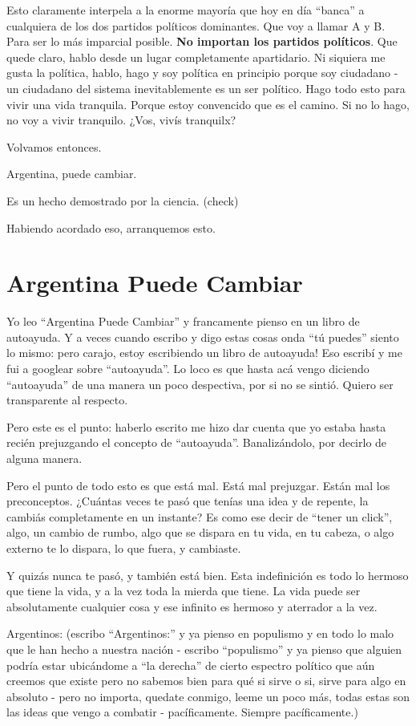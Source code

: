 \documentclass[
]{book}
\begin{document}
Esto claramente interpela a la enorme mayoría que hoy en día ``banca'' a cualquiera de los dos partidos políticos dominantes. Que voy a llamar A y B. Para ser lo más imparcial posible. \textbf{No importan los partidos políticos}. Que quede claro, hablo desde un lugar completamente apartidario. Ni siquiera me gusta la política, hablo, hago y soy política en principio porque soy ciudadano - un ciudadano del sistema inevitablemente es un ser político. Hago todo esto para vivir una vida tranquila. Porque estoy convencido que es el camino. Si no lo hago, no voy a vivir tranquilo. ¿Vos, vivís tranquilx?

Volvamos entonces.

Argentina, puede cambiar.

Es un hecho demostrado por la ciencia. (check)

Habiendo acordado eso, arranquemos esto.

\hypertarget{argentina-puede-cambiar}{%
\section{Argentina Puede Cambiar}\label{argentina-puede-cambiar}}

Yo leo ``Argentina Puede Cambiar'' y francamente pienso en un libro de autoayuda. Y a veces cuando escribo y digo estas cosas onda ``tú puedes'' siento lo mismo: pero carajo, estoy escribiendo un libro de autoayuda! Eso escribí y me fui a googlear sobre ``autoayuda''. Lo loco es que hasta acá vengo diciendo ``autoayuda'' de una manera un poco despectiva, por si no se sintió. Quiero ser transparente al respecto.

Pero este es el punto: haberlo escrito me hizo dar cuenta que yo estaba hasta recién prejuzgando el concepto de ``autoayuda''. Banalizándolo, por decirlo de alguna manera.

Pero el punto de todo esto es que está mal. Está mal prejuzgar. Están mal los preconceptos. ¿Cuántas veces te pasó que tenías una idea y de repente, la cambiás completamente en un instante? Es como ese decir de ``tener un click'', algo, un cambio de rumbo, algo que se dispara en tu vida, en tu cabeza, o algo externo te lo dispara, lo que fuera, y cambiaste.

Y quizás nunca te pasó, y también está bien. Esta indefinición es todo lo hermoso que tiene la vida, y a la vez toda la mierda que tiene. La vida puede ser absolutamente cualquier cosa y ese infinito es hermoso y aterrador a la vez.

Argentinos: (escribo ``Argentinos:'' y ya pienso en populismo y en todo lo malo que le han hecho a nuestra nación - escribo ``populismo'' y ya pienso que alguien podría estar ubicándome a ``la derecha'' de cierto espectro político que aún creemos que existe pero no sabemos bien para qué si sirve o si, sirve para algo en absoluto - pero no importa, quedate conmigo, leeme un poco más, todas estas son las ideas que vengo a combatir - pacíficamente. Siempre pacíficamente.)
\end{document}
